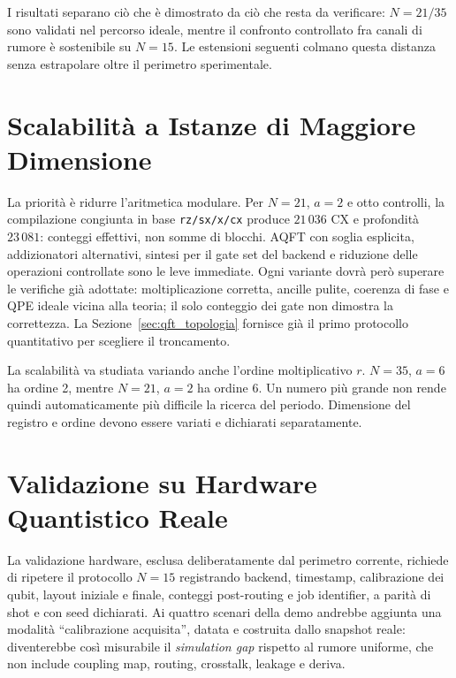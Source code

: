 \begin{onehalfspace}

I risultati separano ciò che è dimostrato da ciò che resta da verificare:
$N=21/35$ sono validati nel percorso ideale, mentre il confronto controllato
fra canali di rumore è sostenibile su $N=15$. Le estensioni seguenti colmano
questa distanza senza estrapolare oltre il perimetro sperimentale.

\section{Scalabilità a Istanze di Maggiore Dimensione}
\label{sec:scalabilita_futura}

La priorità è ridurre l'aritmetica modulare. Per $N=21$, $a=2$ e otto
controlli, la compilazione congiunta in base \texttt{rz/sx/x/cx} produce
$21\,036$ CX e profondità $23\,081$: conteggi effettivi, non somme di blocchi.
AQFT con soglia esplicita, addizionatori alternativi, sintesi per il gate set
del backend e riduzione delle operazioni controllate sono le leve immediate.
Ogni variante dovrà però superare le verifiche già adottate: moltiplicazione
corretta, ancille pulite, coerenza di fase e QPE ideale vicina alla teoria; il
solo conteggio dei gate non dimostra la correttezza. La Sezione~\ref{sec:qft_topologia}
fornisce già il primo protocollo quantitativo per scegliere il troncamento.

La scalabilità va studiata variando anche l'ordine moltiplicativo $r$. $N=35$, $a=6$ ha ordine 2, mentre $N=21$, $a=2$ ha ordine 6. Un numero più grande non rende quindi automaticamente più difficile la ricerca del periodo. Dimensione del registro e ordine devono essere variati e dichiarati separatamente.

\section{Validazione su Hardware Quantistico Reale}
\label{sec:hw_reale}

La validazione hardware, esclusa deliberatamente dal perimetro corrente,
richiede di ripetere il protocollo $N=15$ registrando backend, timestamp,
calibrazione dei qubit, layout iniziale e finale, conteggi post-routing e job
identifier, a parità di shot e con seed dichiarati. Ai quattro scenari della
demo andrebbe aggiunta una modalità ``calibrazione acquisita'', datata e
costruita dallo snapshot reale: diventerebbe così misurabile il
\emph{simulation gap} rispetto al rumore uniforme, che non include coupling
map, routing, crosstalk, leakage e deriva.


\end{onehalfspace}
